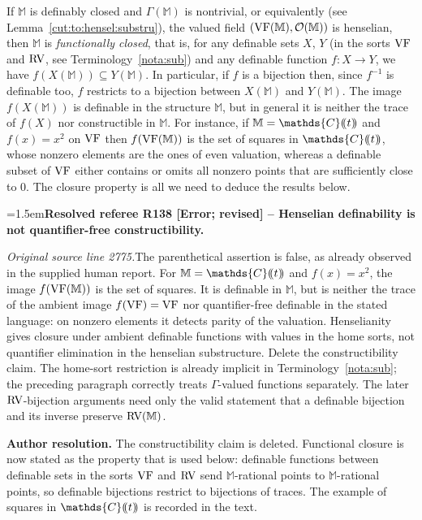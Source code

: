 \documentclass[12pt]{amsart}
\newcommand{\ResolvedRefereeRemark}[5]{%
  \par\medskip\begingroup\normalfont\small\color{gray}%
  \emergencystretch=1.5em\noindent\textbf{Resolved referee R#1 [#2] -- #3.}\par\nobreak\noindent #4\par
  \medskip\color{ResolutionGreen}\noindent\textbf{Author resolution.} #5\par
  \endgroup\medskip
}
\newcommand{\memph}[1]{{\color{magenta}\emph{#1}}}
\theoremstyle{plain}
\theoremstyle{definition}
\theoremstyle{remark}
\newtheorem{rem}[thm]{Remark}
\numberwithin{equation}{section}
\theoremstyle{plain}
\newcommand{\VF}{\textup{VF}}
\newcommand{\RV}{\textup{RV}}
\newcommand{\OO}{\mdl O}
\newcommand{\C}{\mathds{C}}
\newcommand{\0}{\emptyset}
\newcommand{\dpar}[1]{%
   (\mkern-4mu (#1 )\mkern-4mu )}
\newcommand{\mdl}[1]{\mathcal{#1}}  %
\newcommand{\fun}{\longrightarrow}
\newcommand{\sub}{\subseteq}
\begin{document}


If $\mathbb{M}$ is definably closed and $\Gamma(\mathbb{M})$ is nontrivial, or equivalently (see Lemma~\ref{cut:to:hensel:substru}), the valued field $(\VF(\mathbb{M}), \OO(\mathbb{M}))$  is henselian, then $\mathbb{M}$ is \memph{functionally closed}, that is, for any definable sets $X$, $Y$ (in the sorts $\VF$ and $\RV$, see Terminology~\ref{nota:sub}) and any definable function $f : X \fun Y$, we have $f(X(\mathbb{M})) \sub Y(\mathbb{M})$. In particular, if $f$ is a bijection then, since $f^{-1}$ is definable too, $f$ restricts to a bijection between $X(\mathbb{M})$ and $Y(\mathbb{M})$. The image $f(X(\mathbb{M}))$ is definable in the structure $\mathbb{M}$, but in general it is neither the trace of $f(X)$ nor constructible in $\mathbb{M}$. For instance, if $\mathbb{M} = \C \dpar t$ and $f(x) = x^2$ on $\VF$ then $f(\VF(\mathbb{M}))$ is the set of squares in $\C \dpar t$, whose nonzero elements are the ones of even valuation, whereas a definable subset of $\VF$ either contains or omits all nonzero points that are sufficiently close to $0$. The closure property is all we need to deduce the results below.

\ResolvedRefereeRemark{138}{Error; revised}{Henselian definability is not quantifier-free constructibility}{%
\textit{Original source line 2775.}\quad The parenthetical assertion is false, as already observed in the supplied human report. For $\mathbb M=\C\dpar t$ and $f(x)=x^2$, the image $f(\VF(\mathbb M))$ is the set of squares. It is definable in $\mathbb M$, but is neither the trace of the ambient image $f(\VF)=\VF$ nor quantifier-free definable in the stated language: on nonzero elements it detects parity of the valuation. Henselianity gives closure under ambient definable functions with values in the home sorts, not quantifier elimination in the henselian substructure. Delete the constructibility claim. The home-sort restriction is already implicit in Terminology~\ref{nota:sub}; the preceding paragraph correctly treats $\Gamma$-valued functions separately. The later $\RV$-bijection arguments need only the valid statement that a definable bijection and its inverse preserve $\RV(\mathbb M)$.
}{The constructibility claim is deleted. Functional closure is now stated as the property that is used below: definable functions between definable sets in the sorts $\VF$ and $\RV$ send $\mathbb{M}$-rational points to $\mathbb{M}$-rational points, so definable bijections restrict to bijections of traces. The example of squares in $\C\dpar t$ is recorded in the text.}
\end{document}
